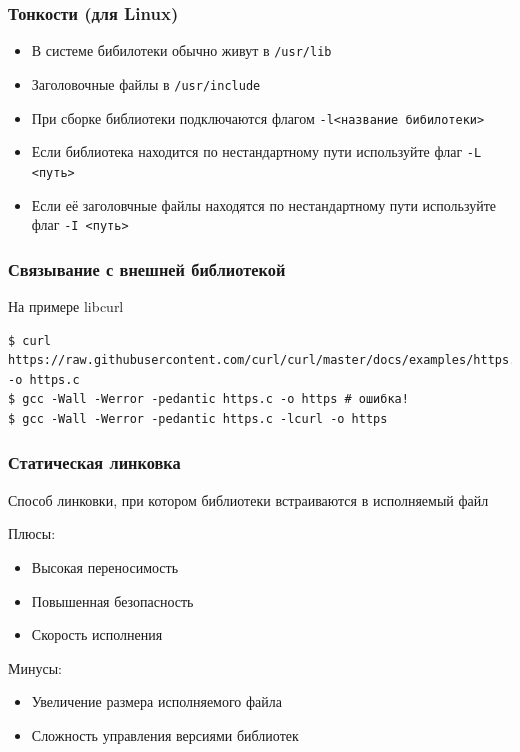 \documentclass[aspectratio=169]{beamer}
\begin{document}
\begin{frame}
    \frametitle{Тонкости (для Linux)}

    \begin{itemize}
        \item В системе бибилотеки обычно живут в \texttt{/usr/lib}
        \item Заголовочные файлы в \texttt{/usr/include}
        \item При сборке библиотеки подключаются флагом \texttt{-l<название бибилотеки>}
        \item Если библиотека находится по нестандартному пути используйте флаг \texttt{-L <путь>}
        \item Если её заголовчные файлы находятся по нестандартному пути используйте флаг \texttt{-I <путь>}
    \end{itemize}

\end{frame}

\begin{frame}[fragile]
    \frametitle{Связывание с внешней библиотекой}

    На примере libcurl
    \begin{verbatim}
$ curl https://raw.githubusercontent.com/curl/curl/master/docs/examples/https.c -o https.c
$ gcc -Wall -Werror -pedantic https.c -o https # ошибка!
$ gcc -Wall -Werror -pedantic https.c -lcurl -o https
    \end{verbatim}
\end{frame}

\begin{frame}
    \frametitle{Статическая линковка}

    Способ линковки, при котором библиотеки встраиваются в исполняемый файл

    Плюсы:
    \begin{itemize}
        \item Высокая переносимость
        \item Повышенная безопасность
        \item Скорость исполнения
    \end{itemize}
    Минусы:
    \begin{itemize}
        \item Увеличение размера исполняемого файла
        \item Сложность управления версиями библиотек
    \end{itemize}
\end{frame}
\end{document}
